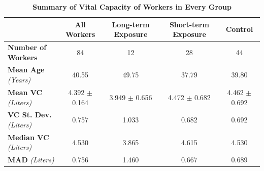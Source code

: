 \documentclass{article}
\begin{document}
		\begin{table}[h!]
			\centering
			\footnotesize
			\caption{\textbf{Summary of Vital Capacity of Workers in Every Group}}
			\begin{tabular}{lcccc}
				\toprule
				\textbf{} & \textbf{All Workers} & \textbf{Long-term Exposure} & \textbf{Short-term Exposure} & \textbf{Control} \\
				\midrule
				\textbf{Number of Workers} & 84 & 12 & 28 & 44 \\
				\textbf{Mean Age} \textit{(Years)} & 40.55 & 49.75 & 37.79 & 39.80 \\
				\textbf{Mean VC} \textit{(Liters)} & 4.392 $\pm$ 0.164 & 3.949 $\pm$ 0.656 & 4.472 $\pm$ 0.682 & 4.462 $\pm$ 0.692 \\
				\textbf{VC St. Dev.} \textit{(Liters)} & 0.757 & 1.033 & 0.682 & 0.692 \\
				\textbf{Median VC} \textit{(Liters)} & 4.530 & 3.865 & 4.615 & 4.530 \\
				\textbf{MAD} \textit{(Liters)} & 0.756 & 1.460 & 0.667 & 0.689 \\
				\bottomrule
			\end{tabular}
		\end{table}

		\newpage
\end{document}
